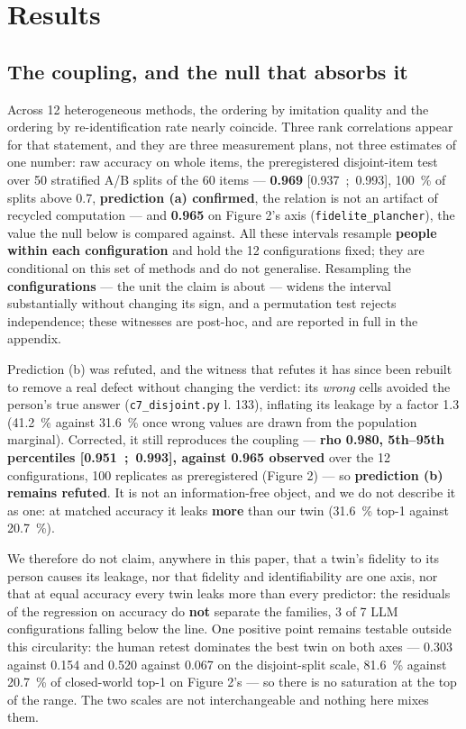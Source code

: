 \documentclass[sigconf,anonymous,review]{acmart}
\begin{document}
\section{Results}

\subsection{The coupling, and the null that absorbs it}

Across 12 heterogeneous methods, the ordering by imitation quality and the ordering by re-identification rate nearly coincide. Three rank correlations appear for that statement, and they are three measurement plans, not three estimates of one number: raw accuracy on whole items, the preregistered disjoint-item test over 50 stratified A/B splits of the 60 items --- \textbf{0.969} [0.937~;~0.993], 100~\% of splits above 0.7, \textbf{prediction (a) confirmed}, the relation is not an artifact of recycled computation --- and \textbf{0.965} on Figure 2's axis (\texttt{fidelite\_\allowbreak{}plancher}), the value the null below is compared against. All these intervals resample \textbf{people within each configuration} and hold the 12 configurations fixed; they are conditional on this set of methods and do not generalise. Resampling the \textbf{configurations} --- the unit the claim is about --- widens the interval substantially without changing its sign, and a permutation test rejects independence; these witnesses are post-hoc, and are reported in full in the appendix.

Prediction (b) was refuted, and the witness that refutes it has since been rebuilt to remove a real defect without changing the verdict: its \textit{wrong} cells avoided the person's true answer (\texttt{c7\_\allowbreak{}disjoint\allowbreak{}.py} l. 133), inflating its leakage by a factor 1.3 (41.2~\% against 31.6~\% once wrong values are drawn from the population marginal). Corrected, it still reproduces the coupling --- \textbf{rho 0.980, 5th--95th percentiles [0.951~;~0.993], against 0.965 observed} over the 12 configurations, 100 replicates as preregistered (Figure 2) --- so \textbf{prediction (b) remains refuted}. It is not an information-free object, and we do not describe it as one: at matched accuracy it leaks \textbf{more} than our twin (31.6~\% top-1 against 20.7~\%).

We therefore do not claim, anywhere in this paper, that a twin's fidelity to its person causes its leakage, nor that fidelity and identifiability are one axis, nor that at equal accuracy every twin leaks more than every predictor: the residuals of the regression on accuracy do \textbf{not} separate the families, 3 of 7 LLM configurations falling below the line. One positive point remains testable outside this circularity: the human retest dominates the best twin on both axes --- 0.303 against 0.154 and 0.520 against 0.067 on the disjoint-split scale, 81.6~\% against 20.7~\% of closed-world top-1 on Figure 2's --- so there is no saturation at the top of the range. The two scales are not interchangeable and nothing here mixes them.
\end{document}
